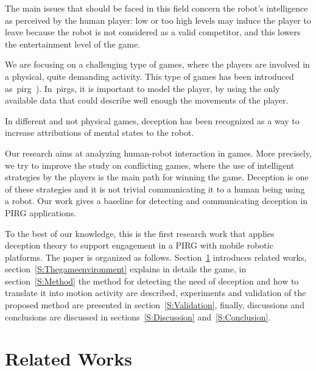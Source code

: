 
The main issues that should be faced in this field concern the robot's intelligence as perceived by the human player: low or too high levels may induce the player to leave because the robot is not considered as a valid competitor, and this lowers the entertainment level of the game. 

We are focusing on a challenging type of games, where the players are involved in a physical, quite demanding activity. This type of games has been introduced as~\gls{pirg}~\cite{martinoia_physically_2013}). In~\gls{pirg}s, it is important to model the player, by using the only available data that could describe well enough the movements of the player.

In different and not physical games, deception has been recognized as a way to increase attributions of mental states to the robot\cite{shim_taxonomy_2013}.

Our research aims at analyzing human-robot interaction in games. More  precisely, we try to improve the study on conflicting games, where the use of intelligent strategies by the players is the main path for winning the game. Deception is one of these strategies and it is not trivial communicating it to a human being using a robot. Our work gives a baseline for detecting and communicating deception in PIRG applications.

To the best of our knowledge, this is the first research work that applies deception theory to support engagement in a PIRG with mobile robotic platforms. 
The paper is organized as follows. Section~\ref{S:RelatedWorks} introduces related works, section~\ref{S:Thegameenvironment} explains in details the game, in section~\ref{S:Method} the method for detecting the need of deception and how to translate it into motion activity are described, experiments and validation of the proposed method are presented in section~\ref{S:Validation}, finally, discussions and conclusions are discussed in sections~\ref{S:Discussion} and~\ref{S:Conclusion}.

\section{Related Works}
\label{S:RelatedWorks}

